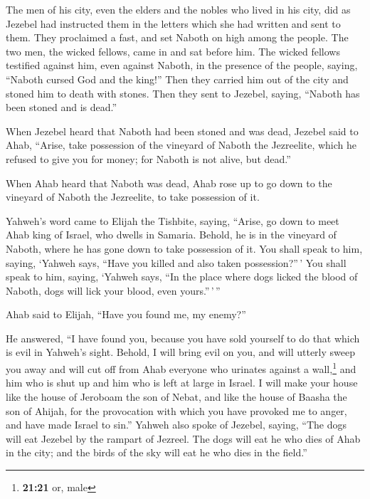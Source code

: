  The men of his city, even the elders and the nobles who
lived in his city, did as Jezebel had instructed them in the letters
which she had written and sent to them.  They proclaimed
a fast, and set Naboth on high among the people.  The two
men, the wicked fellows, came in and sat before him. The wicked fellows
testified against him, even against Naboth, in the presence of the
people, saying, ``Naboth cursed God and the king!'' Then they carried
him out of the city and stoned him to death with stones. 
Then they sent to Jezebel, saying, ``Naboth has been stoned and is
dead.''

 When Jezebel heard that Naboth had been stoned and was
dead, Jezebel said to Ahab, ``Arise, take possession of the vineyard of
Naboth the Jezreelite, which he refused to give you for money; for
Naboth is not alive, but dead.''

 When Ahab heard that Naboth was dead, Ahab rose up to go
down to the vineyard of Naboth the Jezreelite, to take possession of it.

 Yahweh's word came to Elijah the Tishbite, saying,
 ``Arise, go down to meet Ahab king of Israel, who dwells
in Samaria. Behold, he is in the vineyard of Naboth, where he has gone
down to take possession of it.  You shall speak to him,
saying, `Yahweh says, ``Have you killed and also taken possession?''\,'
You shall speak to him, saying, `Yahweh says, ``In the place where dogs
licked the blood of Naboth, dogs will lick your blood, even
yours.''\,'\,''

 Ahab said to Elijah, ``Have you found me, my enemy?''

He answered, ``I have found you, because you have sold yourself to do
that which is evil in Yahweh's sight.  Behold, I will
bring evil on you, and will utterly sweep you away and will cut off from
Ahab everyone who urinates against a wall,\footnote{\textbf{21:21} or,
  male} and him who is shut up and him who is left at large in Israel.
 I will make your house like the house of Jeroboam the
son of Nebat, and like the house of Baasha the son of Ahijah, for the
provocation with which you have provoked me to anger, and have made
Israel to sin.''  Yahweh also spoke of Jezebel, saying,
``The dogs will eat Jezebel by the rampart of Jezreel. 
The dogs will eat he who dies of Ahab in the city; and the birds of the
sky will eat he who dies in the field.''

